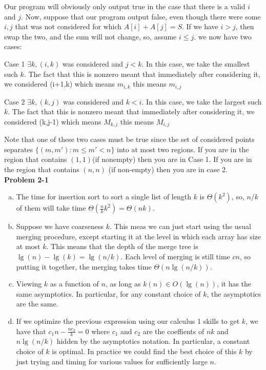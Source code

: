 \documentclass{article}
\begin{document}
Our program will obviously only output true in the case that there is a valid $i$ and $j$. Now, suppose that our program output false, even though there were some $i,j$ that was not considered for which $A[i]+A[j]=S$. If we have $i>j$, then swap the two, and the sum will not change, so, assume $i\le j$. we now have two cases:

Case 1 $\exists k, (i,k)$ was considered and $j<k$. In this case, we take the smallest such $k$. The fact that this is nonzero meant that immediately after considering it, we considered (i+1,k) which means $m_{i,k}$ this means $m_{i,j}$

Case 2 $\exists k, (k,j)$ was considered and $k<i$. In this case, we take the largest such $k$. The fact that this is nonzero meant that immediately after considering it, we considered (k,j-1) which means $M_{k,j}$ this means $M_{i,j}$

Note that one of these two cases must be true since the set of considered points separates $\{(m,m'): m\le m'<n\}$ into at most two regions. If you are in the region that contains $(1,1)$(if nonempty) then you are in Case 1. If you are in the region that contains $(n,n)$ (if non-empty) then you are in case 2. \\

\noindent\textbf{Problem 2-1} \\

\begin{enumerate}[a.]
\item
The time for insertion sort to sort a single list of length $k$ is $\Theta(k^2)$, so, $n/k$ of them will take time $\Theta(\frac{n}{k}k^2) = \Theta(nk)$.

\item
Suppose we have coarseness $k$. This meas we can just start using the usual merging procedure, except starting it at the level in which each array has size at most $k$. This means that the depth of the merge tree is $\lg(n) - \lg(k) = \lg(n/k)$. Each level of merging is still time $cn$, so putting it together, the merging takes time $\Theta(n\lg(n/k))$.


\item
Viewing $k$ as a function of $n$, as long as $k(n)\in O(\lg(n))$, it has the same asymptotics. In particular, for any constant choice of $k$, the asymptotics are the same.

\item
If we optimize the previous expression using our calculus 1 skills to get $k$, we have that $c_1n- \frac{nc_2}{k} = 0$ where $c_1$ and $c_2$ are the coeffients of $nk$ and $n\lg(n/k)$ hidden by the asymptotics notation. In particular, a constant choice of $k$ is optimal. In practice we could find the best choice of this $k$ by just trying and timing  for various values for sufficiently large $n$.

\end{enumerate}
\end{document}
